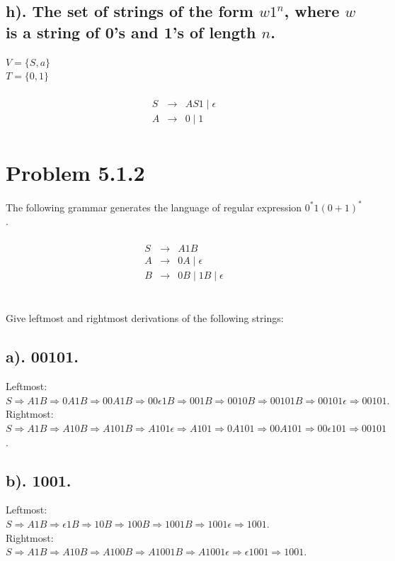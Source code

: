 \documentclass[20pt]{article} %
\begin{document}
\subsection{h). The set of strings of the form $w1^{n}$, where $w$ is a string of 0's and 1's of length $n$.}
$V = \{S,a\}$\\
$T = \{0,1\}$\\
 \begin{table}[!htbp]
 \[\begin{array}{ccc} 
&  \\
 S & \rightarrow & AS1 \mid \epsilon \\
 A & \rightarrow & 0 \mid 1 \\
 \end{array}\]
 \end{table}
\section{Problem 5.1.2}
The following grammar generates the language of regular expression $0^{*}1(0+1)^{*}$. 
 \begin{table}[!htbp]
 \[\begin{array}{ccc} 
&  \\
 S & \rightarrow & A1B\\
 A & \rightarrow & 0A \mid \epsilon \\
 B & \rightarrow  & 0B \mid 1B \mid \epsilon \\
 \end{array}\]
 \end{table} \\
Give leftmost and rightmost derivations of the following strings:
\subsection{a). 00101.}
Leftmost: \\ 
$S\Rightarrow A1B \Rightarrow 0A1B \Rightarrow 00A1B \Rightarrow 00\epsilon1B \Rightarrow 001B \Rightarrow 0010B \Rightarrow 00101B \Rightarrow 00101\epsilon \Rightarrow 00101.$ \\
Rightmost: \\
$S\Rightarrow A1B \Rightarrow A10B \Rightarrow A101B \Rightarrow A101\epsilon \Rightarrow A101 \Rightarrow 0A101 \Rightarrow 00A101 \Rightarrow 00\epsilon101 \Rightarrow00101$.
\subsection{b). 1001.}
Leftmost:\\
$S\Rightarrow A1B \Rightarrow \epsilon1B \Rightarrow 10B \Rightarrow 100B \Rightarrow 1001B \Rightarrow 1001\epsilon \Rightarrow 1001$. \\
Rightmost:\\
$S \Rightarrow A1B \Rightarrow A10B \Rightarrow A100B \Rightarrow A1001B \Rightarrow A1001\epsilon \Rightarrow \epsilon1001 \Rightarrow 1001$.
\end{document}
